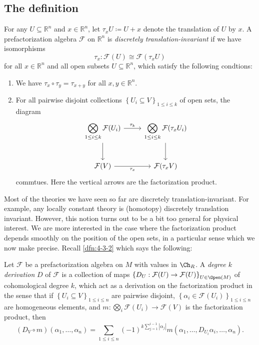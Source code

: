 \subsection{The definition}

\begin{definition}\label{dfn:4-8-1}
	For any $U\subseteq \mathbb{R} ^n$ and $x\in\mathbb{R} ^n$, let $\tau _xU \coloneqq U+x$ denote the translation of $U$ by $x$. A prefactorization algebra $\mathcal{F} $ on $\mathbb{R} ^n$ is \emph{discretely translation-invariant} if we have isomorphisms
	\[
		\tau _x : \mathcal{F} (U) \cong \mathcal{F} (\tau _xU)
	\]
	for all $x\in\mathbb{R} ^n $ and all open subsets $U\subseteq \mathbb{R} ^n $, which satisfy the following condtions:
	\begin{enumerate}
		\item We have $\tau _x \circ \tau _y = \tau _{x+y}$ for all $x,y\in\mathbb{R} ^n$.
		\item For all pairwise disjoint collections $\left\{ U_i \subseteq V \right\} _{1\leq i\leq k} $ of open sets, the diagram
			\[\begin{tikzcd}[row sep = 2.5em, column sep = 2.5em]
				\displaystyle{\bigotimes_{1\leq i\leq k} \mathcal{F} (U_i)}\ar[" \tau _k ", r] \ar[d]  & \displaystyle{\bigotimes_{1\leq i\leq k} \mathcal{F} (\tau _xU_i)}\ar[d]  \\
			\mathcal{F} (V) \ar[" \tau _x "', r]  & \mathcal{F} (\tau _xV)
			\end{tikzcd}\]
			commtues. Here the vertical arrows are the factorization product.
	\end{enumerate}
\end{definition}

Most of the theories we have seen so far are discretely translation-invariant. For example, any locally constant theory is (homotopy) discretely translation invariant. However, this notion turns out to be a bit too general for physical interest. We are more interested in the case where the factorization product depends smoothly on the position of the open sets, in a particular sense which we now make precise. Recall \cref{dfn:4-3-2} which says the following:
\begin{definition}\label{dfn:4-8-2}
	Let $\mathcal{F} $ be a prefactorization algebra on $M$ with values in $\Ch_{R} $. A \emph{degree $k$ derivation} $D$ of $\mathcal{F} $ is a collection of maps $\left\{ D_U : \mathcal{F} (U) \to \mathcal{F} (U) \right\} _{U\in \Open(M) } $ of cohomological degree $k$, which act as a derivation on the factorization product in the sense that if $\left\{ U_i\subseteq V \right\} _{1\leq i\leq n} $ are pairwise disjoint, $\left\{ \alpha _i\in \mathcal{F} (U_i) \right\} _{1\leq i\leq n} $ are homogeneous elements, and $m : \bigotimes_{i} \mathcal{F}(U_i) \to \mathcal{F} (V)$ is the factorization product, then
	\[
		(D_V\circ m)(\alpha _1, \ldots ,\alpha _n) = \sum_{1\leq i\leq n} (-1)^{k \sum_{j=1}^{i-1} \left| \alpha _j \right| } m(\alpha _1, \ldots , D_{U_i} \alpha _i, \ldots ,\alpha _n)
	.\]
\end{definition}

